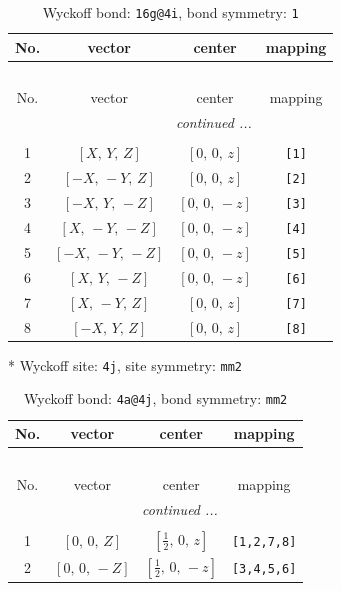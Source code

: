 \documentclass[fleqn,8pt]{jsarticle}
\begin{document}
\begin{longtable}{cccc}
\caption{Wyckoff bond: {\tt 16g@4i}, bond symmetry: {\tt 1}}
 \\
 \hline \hline
No. & vector & center & mapping \\ \hline \endfirsthead

\multicolumn{3}{l}{\tablename\ \thetable{}} \\
 \hline \hline
No. & vector & center & mapping \\ \hline \endhead

 \hline \hline
\multicolumn{3}{r}{\footnotesize\it continued ...} \\ \endfoot

 \hline \hline
\multicolumn{3}{r}{} \\ \endlastfoot

1 & $\left[ X,\, Y,\, Z \right]$ & $\left[ 0,\, 0,\, z \right]$ & {\tt [1]} \\ \hline
2 & $\left[ - X,\, - Y,\, Z \right]$ & $\left[ 0,\, 0,\, z \right]$ & {\tt [2]} \\ \hline
3 & $\left[ - X,\, Y,\, - Z \right]$ & $\left[ 0,\, 0,\, - z \right]$ & {\tt [3]} \\ \hline
4 & $\left[ X,\, - Y,\, - Z \right]$ & $\left[ 0,\, 0,\, - z \right]$ & {\tt [4]} \\ \hline
5 & $\left[ - X,\, - Y,\, - Z \right]$ & $\left[ 0,\, 0,\, - z \right]$ & {\tt [5]} \\ \hline
6 & $\left[ X,\, Y,\, - Z \right]$ & $\left[ 0,\, 0,\, - z \right]$ & {\tt [6]} \\ \hline
7 & $\left[ X,\, - Y,\, Z \right]$ & $\left[ 0,\, 0,\, z \right]$ & {\tt [7]} \\ \hline
8 & $\left[ - X,\, Y,\, Z \right]$ & $\left[ 0,\, 0,\, z \right]$ & {\tt [8]} \\
\end{longtable}
* Wyckoff site: {\tt 4j}, site symmetry: {\tt mm2}
\renewcommand{\arraystretch}{1.2}
\begin{longtable}{cccc}
\caption{Wyckoff bond: {\tt 4a@4j}, bond symmetry: {\tt mm2}}
 \\
 \hline \hline
No. & vector & center & mapping \\ \hline \endfirsthead

\multicolumn{3}{l}{\tablename\ \thetable{}} \\
 \hline \hline
No. & vector & center & mapping \\ \hline \endhead

 \hline \hline
\multicolumn{3}{r}{\footnotesize\it continued ...} \\ \endfoot

 \hline \hline
\multicolumn{3}{r}{} \\ \endlastfoot

1 & $\left[ 0,\, 0,\, Z \right]$ & $\left[ \frac{1}{2},\, 0,\, z \right]$ & {\tt [1,2,7,8]} \\ \hline
2 & $\left[ 0,\, 0,\, - Z \right]$ & $\left[ \frac{1}{2},\, 0,\, - z \right]$ & {\tt [3,4,5,6]} \\
\end{longtable}
\end{document}
